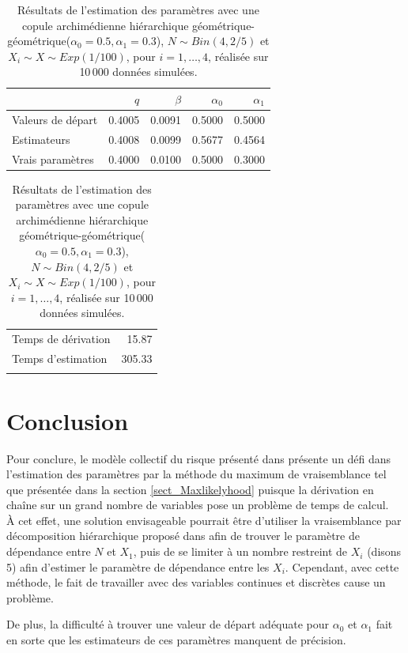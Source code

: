 \documentclass{article}
\begin{document}
		\begin{table}[H]
			\centering
			\begin{tabular}{lrrrr}
				\hline
				& $q$ & $\beta$ & $\alpha_0$ & $\alpha_1$ \\ 
				\hline
				Valeurs de départ & 0.4005 & 0.0091 & 0.5000 & 0.5000 \\ 
				Estimateurs & 0.4008 & 0.0099 & 0.5677 & 0.4564 \\ 
				Vrais paramètres & 0.4000 & 0.0100 & 0.5000 & 0.3000 \\ 
				\hline
			\end{tabular}
			\begin{tabular}{lr}
				\hline
				&  \\ 
				\hline
				Temps de dérivation & 15.87 \\ 
				Temps d'estimation & 305.33 \\ 
				\\
				\hline
			\end{tabular}
			\caption[Résultats du scénario \ref{scenario_geo_geo}]{Résultats de l'estimation des paramètres avec une copule archimédienne hiérarchique géométrique-géométrique($\alpha_0=0.5, \alpha_1=0.3$), $N \sim Bin(4, 2/5)$ et $X_i \sim X \sim Exp(1/100)$, pour $i=1,\dots,4$, réalisée sur 10\,000 données simulées.}
			\label{tbl_resultats_geo_geo}
		\end{table}
	
	
		
	\section{Conclusion}
		Pour conclure, le modèle collectif du risque présenté dans \cite{Itre5} présente un défi dans l'estimation des paramètres par la méthode du maximum de vraisemblance tel que présentée dans la section \ref{sect_Maxlikelyhood} puisque la dérivation en chaîne sur un grand nombre de variables pose un problème de temps de calcul.\\
		
		À cet effet, une solution envisageable pourrait être d'utiliser la vraisemblance par décomposition hiérarchique proposé dans \cite{LikelyhoodEstimation} afin de trouver le paramètre de dépendance entre $N$ et $X_1$, puis de se limiter à un nombre restreint de $X_i$ (disons 5) afin d'estimer le paramètre de dépendance entre les $X_i$. Cependant, avec cette méthode, le fait de travailler avec des variables continues et discrètes cause un problème.
		
		De plus, la difficulté à trouver une valeur de départ adéquate pour $\alpha_{0}$ et $\alpha_{1}$ fait en sorte que les estimateurs de ces paramètres manquent de précision.
	 
		
	\clearpage
	
	
\end{document}
